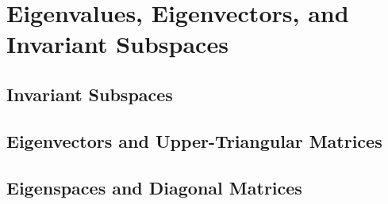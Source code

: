 \chapter{Eigenvalues, Eigenvectors, and Invariant Subspaces}

\section{Invariant Subspaces}

\section{Eigenvectors and Upper-Triangular Matrices}

\section{Eigenspaces and Diagonal Matrices}


